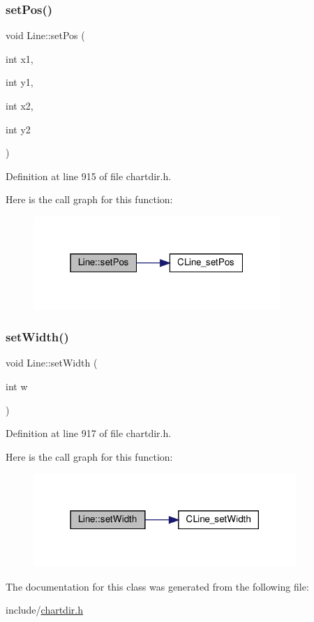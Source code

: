 \subsubsection{\texorpdfstring{set\+Pos()}{setPos()}}
{\footnotesize\ttfamily void Line\+::set\+Pos (\begin{DoxyParamCaption}\item[{int}]{x1,  }\item[{int}]{y1,  }\item[{int}]{x2,  }\item[{int}]{y2 }\end{DoxyParamCaption})\hspace{0.3cm}{\ttfamily [inline]}}



Definition at line 915 of file chartdir.\+h.

Here is the call graph for this function\+:
\nopagebreak
\begin{figure}[H]
\begin{center}
\leavevmode
\includegraphics[width=265pt]{class_line_ad0534be1075fb29d13c0faa823c91e7f_cgraph}
\end{center}
\end{figure}
\mbox{\label{class_line_ae764d60af26e544275df26071ae9fbef}} 
\subsubsection{\texorpdfstring{set\+Width()}{setWidth()}}
{\footnotesize\ttfamily void Line\+::set\+Width (\begin{DoxyParamCaption}\item[{int}]{w }\end{DoxyParamCaption})\hspace{0.3cm}{\ttfamily [inline]}}



Definition at line 917 of file chartdir.\+h.

Here is the call graph for this function\+:
\nopagebreak
\begin{figure}[H]
\begin{center}
\leavevmode
\includegraphics[width=282pt]{class_line_ae764d60af26e544275df26071ae9fbef_cgraph}
\end{center}
\end{figure}


The documentation for this class was generated from the following file\+:\begin{DoxyCompactItemize}
\item 
include/\hyperlink{chartdir_8h}{chartdir.\+h}\end{DoxyCompactItemize}
